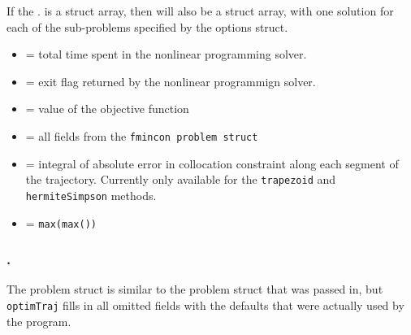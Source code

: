 \par If the . is a struct array, then  will also be a struct array, with one solution for each of the sub-problems specified by the options struct.

\begin{itemize} \setlength\itemsep{-0.1em}
\item {} = total time spent in the nonlinear programming solver.
\item {} = exit flag returned by the nonlinear programmign solver.
\item {} = value of the objective function
\item {} = all fields from the \texttt{fmincon problem struct}
\item {} = integral of absolute error in collocation constraint along each segment of the trajectory. Currently only available for the \texttt{trapezoid} and \texttt{hermiteSimpson} methods.
\item {} = \texttt{max(max())}
\end{itemize}

\subsubsection*{.}

The problem struct is similar to the problem struct that was passed in, but \texttt{optimTraj} fills in all omitted fields with the defaults that were actually used by the program.

